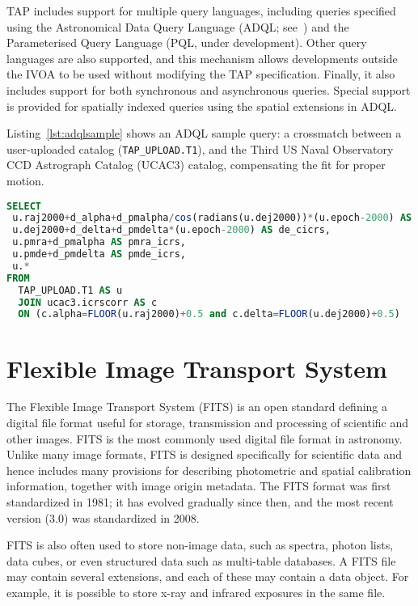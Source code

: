 TAP includes support for multiple query languages, including queries specified using the Astronomical Data Query Language (ADQL; see~\cite{2008adql.ivoav0910O}) and the Parameterised Query Language (PQL, under development). Other query languages are also supported, and this mechanism allows developments outside the IVOA to be used without modifying the TAP specification. Finally, it also includes support for both synchronous and asynchronous queries. Special support is provided for spatially indexed queries using the spatial extensions in ADQL. 

Listing~\ref{lst:adqlsample} shows an ADQL sample query: a crossmatch between a user-uploaded catalog (\texttt{TAP\_UPLOAD.T1}), and
the Third US Naval Observatory CCD Astrograph Catalog (UCAC3) %
catalog, compensating the fit for proper motion.

\begin{lstlisting}[float,language=SQL,caption={ADQL sample query: the results will be a crossmatch between a user-uploaded catalog, and the UCAC3 catalog, compensating the fit for proper motion.},label=lst:adqlsample]
SELECT 
 u.raj2000+d_alpha+d_pmalpha/cos(radians(u.dej2000))*(u.epoch-2000) AS ra_icrs,
 u.dej2000+d_delta+d_pmdelta*(u.epoch-2000) AS de_cicrs,
 u.pmra+d_pmalpha AS pmra_icrs,
 u.pmde+d_pmdelta AS pmde_icrs,
 u.*
FROM
  TAP_UPLOAD.T1 AS u
  JOIN ucac3.icrscorr AS c
  ON (c.alpha=FLOOR(u.raj2000)+0.5 and c.delta=FLOOR(u.dej2000)+0.5)
\end{lstlisting}


\section{Flexible Image Transport System}

The
Flexible Image Transport System (FITS) is an open standard defining a digital file format useful for storage, transmission and processing of scientific and other images. FITS is the most commonly used digital file format in astronomy. Unlike many image formats, FITS is designed specifically for scientific data and hence includes many provisions for describing photometric and spatial calibration information, together with image origin metadata. The FITS format was first standardized in 1981; it has evolved gradually since then, and the most recent version (3.0) was standardized in 2008. 
  
FITS is also often used to store non-image data, such as spectra, photon lists, data cubes, or even structured data such as multi-table databases. A FITS file may contain several extensions, and each of these may contain a data object. For example, it is possible to store x-ray and infrared exposures in the same file. 
 
